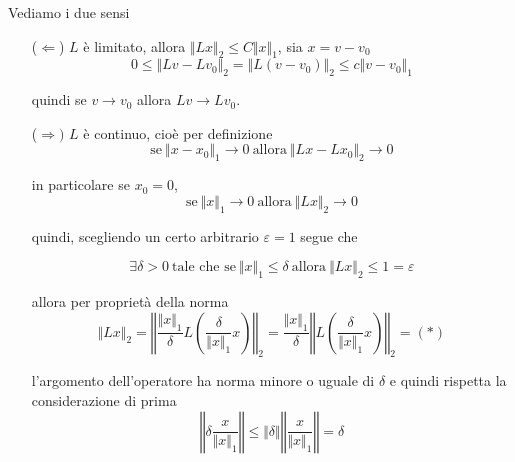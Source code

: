 \documentclass[10pt,a4paper,twoside,openright]{book}
\begin{document}
\begin{dimostrazione}
    Vediamo i due sensi
    \begin{itemize}
        \item[($\Leftarrow $)] $L$ è limitato, allora $\Vert Lx\Vert _{2} \leqslant C\Vert x\Vert _{1}$, sia $x=v-v_{0}$
              \begin{equation*}
                  0\leqslant \Vert Lv-Lv_{0}\Vert _{2} =\Vert L(v-v_{0})\Vert _{2} \leqslant c\Vert v-v_{0}\Vert _{1}
              \end{equation*}

              quindi se $v\rightarrow v_{0}$ allora $Lv\rightarrow Lv_{0}$.

        \item[($\Rightarrow)$] $L$ è continuo, cioè per definizione
              \begin{equation*}
                  \text{se} \ \Vert x-x_{0}\Vert _{1}\rightarrow 0\ \text{allora} \ \Vert Lx-Lx_{0}\Vert _{2}\rightarrow 0
              \end{equation*}

              in particolare se $x_{0} =0$,
              \begin{equation*}
                  \text{se} \ \Vert x\Vert _{1}\rightarrow 0\ \text{allora} \ \Vert Lx\Vert _{2}\rightarrow 0
              \end{equation*}

              quindi, scegliendo un certo arbitrario $\varepsilon =1$ segue che

              \begin{equation*}
                  \exists \delta  >0\ \text{tale che se} \ \Vert x\Vert _{1} \leqslant \delta \ \text{allora} \ \Vert Lx\Vert _{2} \leqslant 1=\varepsilon
              \end{equation*}

              allora per proprietà della norma
              \begin{equation*}
                  \Vert Lx\Vert _{2} =\left\Vert \frac{\Vert x\Vert _{1}}{\delta } L\left(\frac{\delta }{\Vert x\Vert _{1}} x\right)\right\Vert _{2} =\frac{\Vert x\Vert _{1}}{\delta }\left\Vert L\left(\frac{\delta }{\Vert x\Vert _{1}} x\right)\right\Vert _{2} =(*)
              \end{equation*}

              l'argomento dell'operatore ha norma minore o uguale di $\delta $ e quindi rispetta la considerazione di prima
              \begin{equation*}
                  \left\Vert \delta \frac{x}{\Vert x\Vert _{1}}\right\Vert \leqslant \Vert \delta \Vert \left\Vert \frac{x}{\Vert x\Vert _{1}}\right\Vert =\delta
              \end{equation*}


\end{itemize}
\end{dimostrazione}
\end{document}
